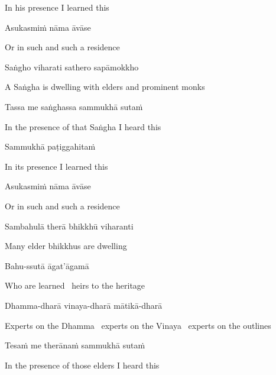 \begin{english}
  In his presence I learned this
\end{english}

Asukasmiṁ nāma āvāse

\begin{english}
  Or in such and such a residence
\end{english}

Saṅgho viharati sathero sapāmokkho

\begin{english}
  A Saṅgha is dwelling with elders and prominent monks
\end{english}

Tassa me saṅghassa sammukhā sutaṁ

\begin{english}
  In the presence of that Saṅgha I heard this
\end{english}

Sammukhā paṭiggahitaṁ

\begin{english}
  In its presence I learned this
\end{english}

Asukasmiṁ nāma āvāse

\begin{english}
  Or in such and such a residence
\end{english}

Sambahulā therā bhikkhū viharanti

\begin{english}
  Many elder bhikkhus are dwelling
\end{english}

Bahu-ssutā āgat'āgamā

\begin{english}
  Who are learned \breathmark\ heirs to the heritage
\end{english}

Dhamma-dharā vinaya-dharā mātikā-dharā

\begin{english-hang}
  Experts on the Dhamma \breathmark\ experts on the Vinaya \breathmark\ experts on the outlines
\end{english-hang}

Tesaṁ me therānaṁ sammukhā sutaṁ

\begin{english}
  In the presence of those elders I heard this
\end{english}

